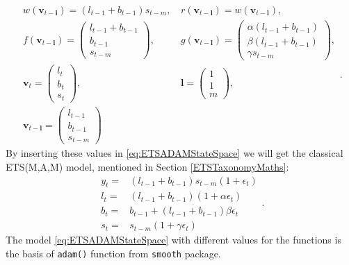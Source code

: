 \documentclass[
]{book}
\theoremstyle{definition}
\theoremstyle{definition}
\theoremstyle{definition}
\theoremstyle{definition}
\theoremstyle{remark}
\begin{document}
\begin{equation*}
  \begin{aligned}
    w(\mathbf{v}_{t-\mathbf{l}}) = (l_{t-1}+b_{t-1}) s_{t-m}\text{, } &
    r(\mathbf{v}_{t-\mathbf{l}}) = w(\mathbf{v}_{t-\mathbf{l}}), \\
    f(\mathbf{v}_{t-\mathbf{l}}) = \begin{pmatrix} l_{t-1} + b_{t-1} \\ b_{t-1} \\ s_{t-m} \end{pmatrix}\text{, } &
    g(\mathbf{v}_{t-\mathbf{l}}) = \begin{pmatrix} \alpha (l_{t-1} + b_{t-1}) \\ \beta (l_{t-1} + b_{t-1}) \\ \gamma s_{t-m} \end{pmatrix}, \\
    \mathbf{v}_{t} = \begin{pmatrix} l_t \\ b_t \\ s_t \end{pmatrix}\text{, } &
    \mathbf{l} = \begin{pmatrix} 1 \\ 1 \\ m \end{pmatrix}, \\
    \mathbf{v}_{t-\mathbf{l}} = \begin{pmatrix} l_{t-1} \\ b_{t-1} \\ s_{t-m} \end{pmatrix}
  \end{aligned}.
\end{equation*}
By inserting these values in \eqref{eq:ETSADAMStateSpace} we will get the classical ETS(M,A,M) model, mentioned in Section \ref{ETSTaxonomyMaths}:
\begin{equation}
  \begin{aligned}
    y_{t} = & (l_{t-1} + b_{t-1}) s_{t-m}(1 + \epsilon_t) \\
    l_t = & (l_{t-1} + b_{t-1})(1 + \alpha \epsilon_t) \\
    b_t = & b_{t-1} + (l_{t-1} + b_{t-1}) \beta \epsilon_t \\
    s_t = & s_{t-m} (1 + \gamma \epsilon_t) 
  \end{aligned}.
  \label{eq:ETSADAMMAM}
\end{equation}
The model \eqref{eq:ETSADAMStateSpace} with different values for the functions is the basis of \texttt{adam()} function from \texttt{smooth} package.
\end{document}
